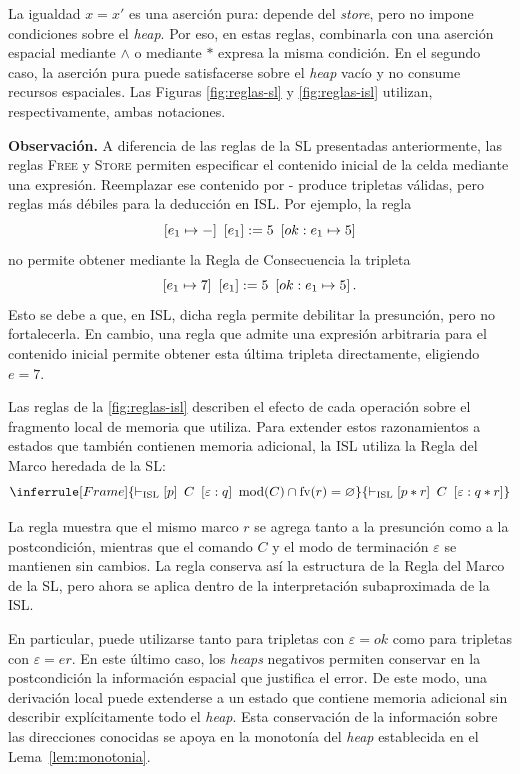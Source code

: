 \documentclass[a4paper,	11pt]{report}
\begin{document}
La igualdad $x = x'$ es una aserción pura:
depende del \emph{store},
pero no impone condiciones sobre el \emph{heap}.
Por eso,
en estas reglas,
combinarla con una aserción espacial mediante $\land$ o mediante $*$ expresa la misma condición.
En el segundo caso,
la aserción pura puede satisfacerse sobre el \emph{heap} vacío y no consume recursos espaciales.
Las Figuras \ref{fig:reglas-sl} y \ref{fig:reglas-isl} utilizan,
respectivamente,
ambas notaciones.

\textbf{Observación.}
A diferencia de las reglas de la SL presentadas anteriormente,
las reglas \textsc{Free} y \textsc{Store} permiten especificar el contenido inicial de la celda mediante una expresión.
Reemplazar ese contenido por - produce tripletas válidas,
pero reglas más débiles para la deducción en ISL.
Por ejemplo,
la regla
$$\left\lbrack e_1 \mapsto - \right\rbrack~[e_1] := 5~\left\lbrack ok : e_1 \mapsto 5 \right\rbrack$$
no permite obtener mediante la Regla de Consecuencia la tripleta
$$\left\lbrack e_1 \mapsto 7 \right\rbrack~[e_1] := 5~\left\lbrack ok : e_1 \mapsto 5 \right\rbrack.$$
Esto se debe a que,
en ISL,
dicha regla permite debilitar la presunción,
pero no fortalecerla.
En cambio,
una regla que admite una expresión arbitraria para el contenido inicial permite obtener esta última tripleta directamente,
eligiendo $e = 7$.

Las reglas de la \autoref{fig:reglas-isl} describen el efecto de cada operación sobre el fragmento local de memoria que utiliza.
Para extender estos razonamientos a estados que también contienen memoria adicional,
la ISL utiliza la Regla del Marco heredada de la SL:
\begin{equation}
  \inferrule [Frame]
  {\vdash_{\mathrm{ISL}} \itriple{p}{C}{\varepsilon : q} \ \text{mod}(C) \cap \text{fv}(r) = \varnothing}
  {\vdash_{\mathrm{ISL}} \itriple{p * r}{C}{\varepsilon : q * r}}
\label{eq:frame-isl}
\end{equation}

La regla muestra que el mismo marco $r$ se agrega tanto a la presunción como a la postcondición,
mientras que el comando $C$ y el modo de terminación $\varepsilon$ se mantienen sin cambios.
La regla conserva así la estructura de la Regla del Marco de la SL,
pero ahora se aplica dentro de la interpretación subaproximada de la ISL.

En particular, puede utilizarse tanto para tripletas con $\varepsilon = ok$
como para tripletas con $\varepsilon = er$.
En este último caso,
los \emph{heaps} negativos permiten conservar en la postcondición la información espacial que justifica el error.
De este modo,
una derivación local puede extenderse a un estado que contiene memoria adicional sin describir explícitamente todo el \emph{heap}.
Esta conservación de la información sobre las direcciones conocidas se apoya en la monotonía del \emph{heap} establecida en el Lema~\ref{lem:monotonia}.
\end{document}
